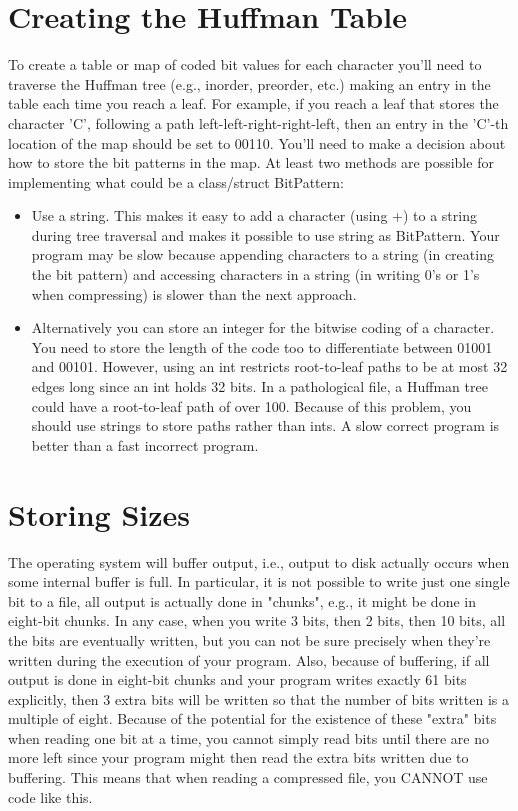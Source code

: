 \documentclass[12pt]{report}
\begin{document}
\section{Creating the Huffman Table}

To create a table or map of coded bit values for each character you'll need to traverse the Huffman tree (e.g., inorder, preorder, etc.) making an entry in the table each time you reach a leaf. For example, if you reach a leaf that stores the character 'C', following a path left-left-right-right-left, then an entry in the 'C'-th location of the map should be set to 00110. You'll need to make a decision about how to store the bit patterns in the map. At least two methods are possible for implementing what could be a class/struct BitPattern: 

\begin{itemize}

\item    Use a string. This makes it easy to add a character (using +) to a string during tree traversal and makes it possible to use string as BitPattern. Your program may be slow because appending characters to a string (in creating the bit pattern) and accessing characters in a string (in writing 0's or 1's when compressing) is slower than the next approach.

\item    Alternatively you can store an integer for the bitwise coding of a character. You need to store the length of the code too to differentiate between 01001 and 00101. However, using an int restricts root-to-leaf paths to be at most 32 edges long since an int holds 32 bits. In a pathological file, a Huffman tree could have a root-to-leaf path of over 100. Because of this problem, you should use strings to store paths rather than ints. A slow correct program is better than a fast incorrect program. 

\end{itemize}

\section{Storing Sizes}

The operating system will buffer output, i.e., output to disk actually occurs when some internal buffer is full. In particular, it is not possible to write just one single bit to a file, all output is actually done in "chunks", e.g., it might be done in eight-bit chunks. In any case, when you write 3 bits, then 2 bits, then 10 bits, all the bits are eventually written, but you can not be sure precisely when they're written during the execution of your program. Also, because of buffering, if all output is done in eight-bit chunks and your program writes exactly 61 bits explicitly, then 3 extra bits will be written so that the number of bits written is a multiple of eight. Because of the potential for the existence of these "extra" bits when reading one bit at a time, you cannot simply read bits until there are no more left since your program might then read the extra bits written due to buffering. This means that when reading a compressed file, you CANNOT use code like this.
\end{document}
